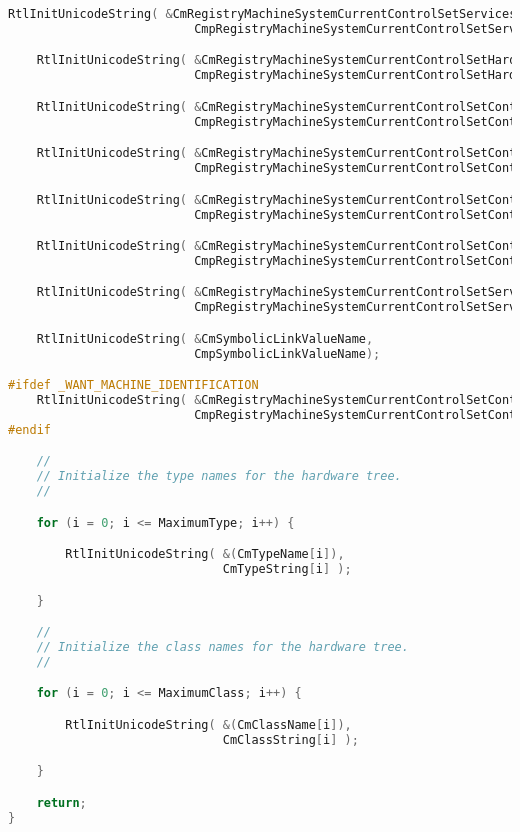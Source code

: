 \begin{lstlisting}[language=C, basicstyle=\tiny]
    RtlInitUnicodeString( &CmRegistryMachineSystemCurrentControlSetServices,
                          CmpRegistryMachineSystemCurrentControlSetServicesString);

    RtlInitUnicodeString( &CmRegistryMachineSystemCurrentControlSetHardwareProfilesCurrent,
                          CmpRegistryMachineSystemCurrentControlSetHardwareProfilesCurrentString);

    RtlInitUnicodeString( &CmRegistryMachineSystemCurrentControlSetControlClass,
                          CmpRegistryMachineSystemCurrentControlSetControlClassString);

    RtlInitUnicodeString( &CmRegistryMachineSystemCurrentControlSetControlSafeBoot,
                          CmpRegistryMachineSystemCurrentControlSetControlSafeBootString);

    RtlInitUnicodeString( &CmRegistryMachineSystemCurrentControlSetControlSessionManagerMemoryManagement,
                          CmpRegistryMachineSystemCurrentControlSetControlSessionManagerMemoryManagementString);

    RtlInitUnicodeString( &CmRegistryMachineSystemCurrentControlSetControlBootLog,
                          CmpRegistryMachineSystemCurrentControlSetControlBootLogString);

    RtlInitUnicodeString( &CmRegistryMachineSystemCurrentControlSetServicesEventLog,
                          CmpRegistryMachineSystemCurrentControlSetServicesEventLogString);

    RtlInitUnicodeString( &CmSymbolicLinkValueName,
                          CmpSymbolicLinkValueName);

#ifdef _WANT_MACHINE_IDENTIFICATION
    RtlInitUnicodeString( &CmRegistryMachineSystemCurrentControlSetControlBiosInfo,
                          CmpRegistryMachineSystemCurrentControlSetControlBiosInfoString);
#endif

    //
    // Initialize the type names for the hardware tree.
    //

    for (i = 0; i <= MaximumType; i++) {

        RtlInitUnicodeString( &(CmTypeName[i]),
                              CmTypeString[i] );

    }

    //
    // Initialize the class names for the hardware tree.
    //

    for (i = 0; i <= MaximumClass; i++) {

        RtlInitUnicodeString( &(CmClassName[i]),
                              CmClassString[i] );

    }

    return;
}
\end{lstlisting}

